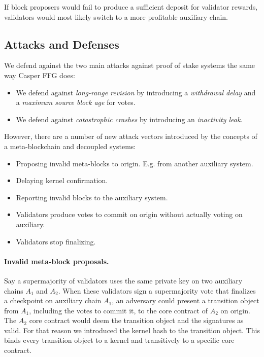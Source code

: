 \documentclass[12pt,a4paper]{article}
\begin{document}
If block proposers would fail to produce a sufficient deposit for validator rewards, validators would most likely switch to a more profitable auxiliary chain.

\subsection{Attacks and Defenses}

We defend against the two main attacks against proof of stake systems the same way Casper FFG\cite{casperffg} does:
\begin{itemize}
    \item We defend against \emph{long-range revision} by introducing a \emph{withdrawal delay} and a \emph{maximum source block age} for votes.
    \item We defend against \emph{catastrophic crashes} by introducing an \emph{inactivity leak}.
\end{itemize}
However, there are a number of new attack vectors introduced by the concepts of a meta-blockchain and decoupled systems:
\begin{itemize}
    \item Proposing invalid meta-blocks to origin. E.g. from another auxiliary system.
    \item Delaying kernel confirmation.
    \item Reporting invalid blocks to the auxiliary system.
    \item Validators produce votes to commit on origin without actually voting on auxiliary.
    \item Validators stop finalizing.
\end{itemize}

\paragraph{Invalid meta-block proposals.}
Say a supermajority of validators uses the same private key on two auxiliary chains $A_1$ and $A_2$.
When these validators sign a supermajority vote that finalizes a checkpoint on auxiliary chain $A_1$, an adversary could present a transition object from $A_1$, including the votes to commit it, to the core contract of $A_2$ on origin.
The $A_2$ core contract would deem the transition object and the signatures as valid.
For that reason we introduced the kernel hash to the transition object.
This binds every transition object to a kernel and transitively to a specific core contract.
\end{document}
